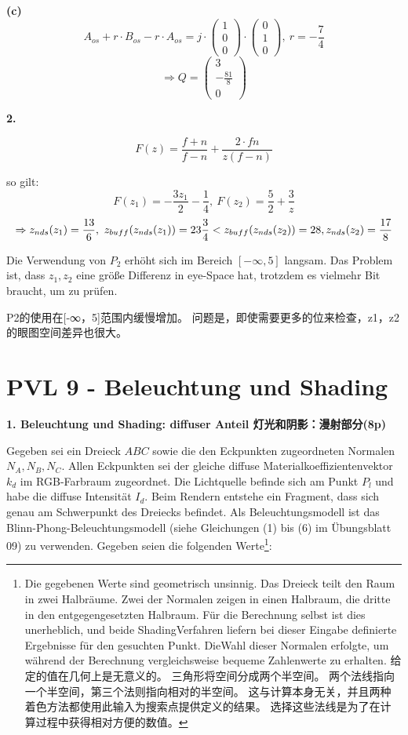 \documentclass[fleqn]{article}
\begin{document}
\indent\indent\textbf{(c)}
$$A_{os} + r \cdot B_{os} - r \cdot A_{os} = j \cdot \begin{pmatrix} 1 \\ 0 \\ 0 \end{pmatrix} \cdot \begin{pmatrix} 0 \\ 1 \\ 0 \end{pmatrix}, \ r = -\frac{7}{4}$$
$$\Rightarrow Q=\begin{pmatrix} 3 \\ -\frac{81}{8} \\ 0 \end{pmatrix}$$

\indent\textbf{2.}

$$F(z) = \frac{f+n}{f-n} + \frac{2\cdot fn}{z(f-n)}$$

so gilt:
$$F(z_1) = -\frac{3z_1}{2} - \frac{1}{4}, \ F(z_2) = \frac{5}{2}+\frac{3}{z}$$
$$\Rightarrow z_{nds}(z_1) = \frac{13}{6}, \ z_{buff}(z_{nds}(z_1)) = 23\frac{3}{4} < z_{buff}(z_{nds}(z_2))=28, \\ z_{nds}(z_2) = \frac{17}{8}$$

Die Verwendung von $P_2$ erhöht sich im Bereich $[-\infty,5]$ langsam. Das Problem ist, dass $z_1,z_2$ eine größe Differenz in eye-Space hat, trotzdem es vielmehr Bit braucht, um zu prüfen.

P2的使用在[-∞，5]范围内缓慢增加。 问题是，即使需要更多的位来检查，z1，z2的眼图空间差异也很大。

\newpage

\section{PVL 9 - Beleuchtung und Shading}

\noindent\textbf{1. Beleuchtung und Shading: diffuser Anteil 灯光和阴影：漫射部分(8p)}

Gegeben sei ein Dreieck $ABC$ sowie die den Eckpunkten zugeordneten Normalen $N_A, N_B, N_C$.
 Allen Eckpunkten sei der gleiche diffuse Materialkoeffizientenvektor $k_d$ im RGB-Farbraum zugeordnet. 
 Die Lichtquelle befinde sich am Punkt $P_l$ und habe die diffuse Intensität $I_d$. 
 Beim Rendern entstehe ein Fragment, dass sich genau am Schwerpunkt des Dreiecks befindet. 
 Als Beleuchtungsmodell ist das Blinn-Phong-Beleuchtungsmodell (siehe Gleichungen (1) bis (6) im Übungsblatt 09) zu verwenden. Gegeben seien die folgenden 
 Werte\footnote{Die gegebenen Werte sind geometrisch unsinnig. Das Dreieck teilt den Raum in zwei Halbräume. Zwei der Normalen zeigen in einen Halbraum, die dritte in den entgegengesetzten Halbraum. Für die Berechnung selbst ist dies unerheblich, und beide ShadingVerfahren liefern bei dieser Eingabe definierte Ergebnisse für den gesuchten Punkt. DieWahl dieser Normalen erfolgte, um während der Berechnung vergleichsweise bequeme Zahlenwerte zu erhalten. 给定的值在几何上是无意义的。 三角形将空间分成两个半空间。 两个法线指向一个半空间，第三个法则指向相对的半空间。 这与计算本身无关，并且两种着色方法都使用此输入为搜索点提供定义的结果。 选择这些法线是为了在计算过程中获得相对方便的数值。}:
\end{document}
